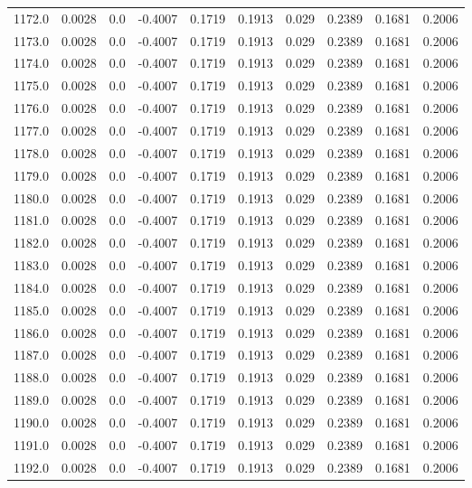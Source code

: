 \begin{longtable}{lrrrrrrrrr}
1172.0 & 0.0028 & 0.0 & -0.4007 & 0.1719 & 0.1913 & 0.029 & 0.2389 & 0.1681 & 0.2006 \\
1173.0 & 0.0028 & 0.0 & -0.4007 & 0.1719 & 0.1913 & 0.029 & 0.2389 & 0.1681 & 0.2006 \\
1174.0 & 0.0028 & 0.0 & -0.4007 & 0.1719 & 0.1913 & 0.029 & 0.2389 & 0.1681 & 0.2006 \\
1175.0 & 0.0028 & 0.0 & -0.4007 & 0.1719 & 0.1913 & 0.029 & 0.2389 & 0.1681 & 0.2006 \\
1176.0 & 0.0028 & 0.0 & -0.4007 & 0.1719 & 0.1913 & 0.029 & 0.2389 & 0.1681 & 0.2006 \\
1177.0 & 0.0028 & 0.0 & -0.4007 & 0.1719 & 0.1913 & 0.029 & 0.2389 & 0.1681 & 0.2006 \\
1178.0 & 0.0028 & 0.0 & -0.4007 & 0.1719 & 0.1913 & 0.029 & 0.2389 & 0.1681 & 0.2006 \\
1179.0 & 0.0028 & 0.0 & -0.4007 & 0.1719 & 0.1913 & 0.029 & 0.2389 & 0.1681 & 0.2006 \\
1180.0 & 0.0028 & 0.0 & -0.4007 & 0.1719 & 0.1913 & 0.029 & 0.2389 & 0.1681 & 0.2006 \\
1181.0 & 0.0028 & 0.0 & -0.4007 & 0.1719 & 0.1913 & 0.029 & 0.2389 & 0.1681 & 0.2006 \\
1182.0 & 0.0028 & 0.0 & -0.4007 & 0.1719 & 0.1913 & 0.029 & 0.2389 & 0.1681 & 0.2006 \\
1183.0 & 0.0028 & 0.0 & -0.4007 & 0.1719 & 0.1913 & 0.029 & 0.2389 & 0.1681 & 0.2006 \\
1184.0 & 0.0028 & 0.0 & -0.4007 & 0.1719 & 0.1913 & 0.029 & 0.2389 & 0.1681 & 0.2006 \\
1185.0 & 0.0028 & 0.0 & -0.4007 & 0.1719 & 0.1913 & 0.029 & 0.2389 & 0.1681 & 0.2006 \\
1186.0 & 0.0028 & 0.0 & -0.4007 & 0.1719 & 0.1913 & 0.029 & 0.2389 & 0.1681 & 0.2006 \\
1187.0 & 0.0028 & 0.0 & -0.4007 & 0.1719 & 0.1913 & 0.029 & 0.2389 & 0.1681 & 0.2006 \\
1188.0 & 0.0028 & 0.0 & -0.4007 & 0.1719 & 0.1913 & 0.029 & 0.2389 & 0.1681 & 0.2006 \\
1189.0 & 0.0028 & 0.0 & -0.4007 & 0.1719 & 0.1913 & 0.029 & 0.2389 & 0.1681 & 0.2006 \\
1190.0 & 0.0028 & 0.0 & -0.4007 & 0.1719 & 0.1913 & 0.029 & 0.2389 & 0.1681 & 0.2006 \\
1191.0 & 0.0028 & 0.0 & -0.4007 & 0.1719 & 0.1913 & 0.029 & 0.2389 & 0.1681 & 0.2006 \\
1192.0 & 0.0028 & 0.0 & -0.4007 & 0.1719 & 0.1913 & 0.029 & 0.2389 & 0.1681 & 0.2006 \\

\end{longtable}
